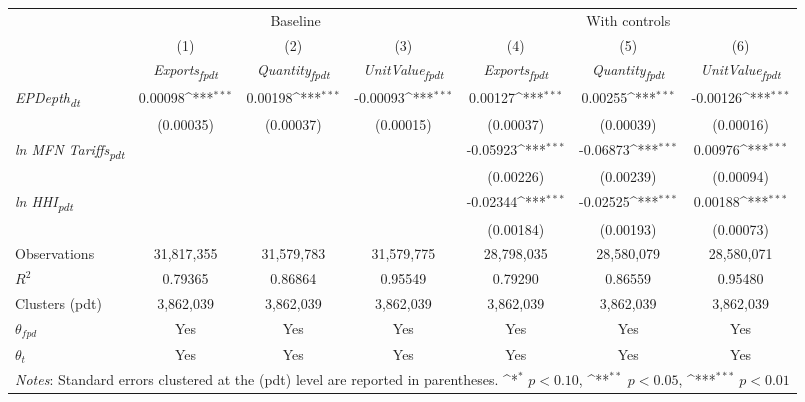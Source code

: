 {
\def\sym#1{\ifmmode^{#1}\else\(^{#1}\)\fi}
\begin{tabular}{l*{6}{c}}
\toprule
&\multicolumn{3}{c}{Baseline}&\multicolumn{3}{c}{With controls}\\\cmidrule(lr){2-4}\cmidrule(lr){5-7}
&(1)&(2)&(3)&(4)&(5)&(6)\\
&\textit{Exports\textsubscript{fpdt}}&\textit{Quantity\textsubscript{fpdt}}&\textit{UnitValue\textsubscript{fpdt}}&\textit{Exports\textsubscript{fpdt}}&\textit{Quantity\textsubscript{fpdt}}&\textit{UnitValue\textsubscript{fpdt}}\\
\midrule
\textit{EPDepth\textsubscript{dt}} & 0.00098\sym{***} & 0.00198\sym{***} & -0.00093\sym{***} & 0.00127\sym{***} & 0.00255\sym{***} & -0.00126\sym{***}\\
 & (0.00035) & (0.00037) & (0.00015) & (0.00037) & (0.00039) & (0.00016)\\
\addlinespace
\textit{ln MFN Tariffs\textsubscript{pdt}} &  &  &  & -0.05923\sym{***} & -0.06873\sym{***} & 0.00976\sym{***}\\
 &  &  &  & (0.00226) & (0.00239) & (0.00094)\\
\addlinespace
\textit{ln HHI\textsubscript{pdt}} &  &  &  & -0.02344\sym{***} & -0.02525\sym{***} & 0.00188\sym{***}\\
 &  &  &  & (0.00184) & (0.00193) & (0.00073)\\
\midrule
Observations & 31,817,355 & 31,579,783 & 31,579,775 & 28,798,035 & 28,580,079 & 28,580,071\\
$R^{2}$ & 0.79365 & 0.86864 & 0.95549 & 0.79290 & 0.86559 & 0.95480\\
Clusters (pdt) & 3,862,039 & 3,862,039 & 3,862,039 & 3,862,039 & 3,862,039 & 3,862,039\\
$\theta_{fpd}$ & Yes & Yes & Yes & Yes & Yes & Yes\\
$\theta_{t}$ & Yes & Yes & Yes & Yes & Yes & Yes\\
\bottomrule
\multicolumn{7}{l}{\footnotesize \textit{Notes}: Standard errors clustered at the (pdt) level are reported in parentheses. \sym{*} \(p<0.10\), \sym{**} \(p<0.05\), \sym{***} \(p<0.01\)}\\
\end{tabular}
}
